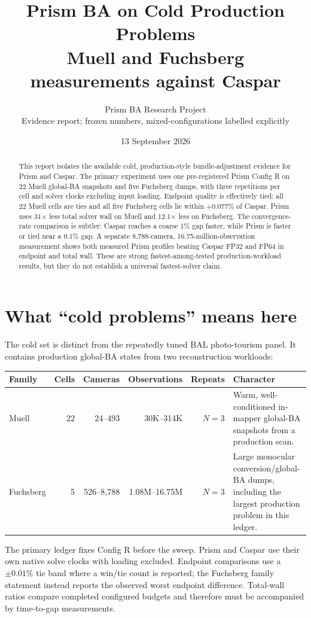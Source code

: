 \documentclass[10pt]{article}
\title{\vspace{-1.4em}\textbf{Prism BA on Cold Production Problems}\\
\large Muell and Fuchsberg measurements against Caspar}
\author{Prism BA Research Project\\\small Evidence report; frozen numbers, mixed-configurations labelled explicitly}
\date{13 September 2026}
\begin{document}
\maketitle

\begin{abstract}
This report isolates the available cold, production-style bundle-adjustment evidence for Prism and Caspar.  The primary experiment uses one pre-registered Prism Config R on 22 Muell global-BA snapshots and five Fuchsberg dumps, with three repetitions per cell and solver clocks excluding input loading.  Endpoint quality is effectively tied: all 22 Muell cells are ties and all five Fuchsberg cells lie within $+0.077\%$ of Caspar.  Prism uses 31$\times$ less total solver wall on Muell and 12.1$\times$ less on Fuchsberg.  The convergence-rate comparison is subtler: Caspar reaches a coarse 1\% gap faster, while Prism is faster or tied near a 0.1\% gap.  A separate 8,788-camera, 16.75-million-observation measurement shows both measured Prism profiles beating Caspar FP32 and FP64 in endpoint and total wall.  These are strong fastest-among-tested production-workload results, but they do not establish a universal fastest-solver claim.
\end{abstract}

\section{What ``cold problems'' means here}

The cold set is distinct from the repeatedly tuned BAL photo-tourism panel.  It contains production global-BA states from two reconstruction workloads:

\begin{center}
\begin{tabularx}{0.96\linewidth}{lrrrrY}
\toprule
Family & Cells & Cameras & Observations & Repeats & Character \\
\midrule
Muell & 22 & 24--493 & 30K--314K & $N=3$ & Warm, well-conditioned in-mapper global-BA snapshots from a production scan. \\
Fuchsberg & 5 & 526--8,788 & 1.08M--16.75M & $N=3$ & Large monocular conversion/global-BA dumps, including the largest production problem in this ledger. \\
\bottomrule
\end{tabularx}
\end{center}

The primary ledger fixes Config R before the sweep.  Prism and Caspar use their own native solve clocks with loading excluded.  Endpoint comparisons use a $\pm0.01\%$ tie band where a win/tie count is reported; the Fuchsberg family statement instead reports the observed worst endpoint difference.  Total-wall ratios compare completed configured budgets and therefore must be accompanied by time-to-gap measurements.
\end{document}
